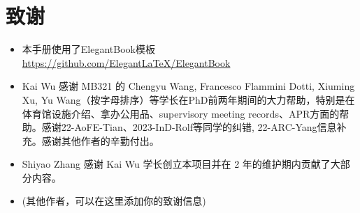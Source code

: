 \chapter{致谢}
\begin{itemize}
    \item 本手册使用了ElegantBook模板 \url{https://github.com/ElegantLaTeX/ElegantBook}
    \item Kai Wu 感谢 MB321 的 Chengyu Wang, Francesco Flammini Dotti, Xiuming Xu, Yu Wang（按字母排序）等学长在PhD前两年期间的大力帮助，特别是在体育馆设施介绍、拿办公用品、supervisory meeting records、APR方面的帮助。感谢22-AoFE-Tian、2023-InD-Rolf等同学的纠错, 22-ARC-Yang信息补充。感谢其他作者的辛勤付出。
    \item Shiyao Zhang 感谢 Kai Wu 学长创立本项目并在 2 年的维护期内贡献了大部分内容。
    \item (其他作者，可以在这里添加你的致谢信息)
\end{itemize}


